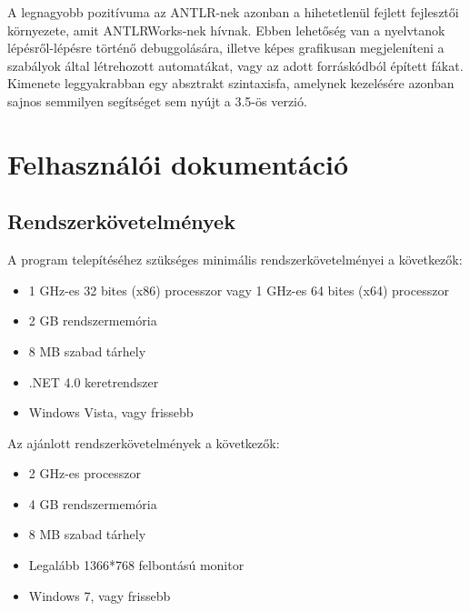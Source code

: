 \documentclass[a4paper,12pt]{report}
\begin{document}
A legnagyobb pozitívuma az ANTLR-nek azonban a hihetetlenül fejlett fejlesztői környezete, amit ANTLRWorks-nek hívnak. Ebben lehetőség van a nyelvtanok lépésről-lépésre történő debuggolására, illetve képes grafikusan megjeleníteni a szabályok által létrehozott automatákat, vagy az adott forráskódból épített fákat. \\

Kimenete leggyakrabban egy absztrakt szintaxisfa, amelynek kezelésére azonban sajnos semmilyen segítséget sem nyújt a 3.5-ös verzió.








\chapter{Felhasználói dokumentáció}

\section{Rendszerkövetelmények}
A program telepítéséhez szükséges minimális rendszerkövetelményei a következők:
\begin{itemize}
    \item 1 GHz-es 32 bites (x86) processzor vagy 1 GHz-es 64 bites (x64) processzor
    \item 2 GB rendszermemória
    \item 8 MB szabad tárhely
    \item .NET 4.0 keretrendszer
    \item Windows Vista, vagy frissebb
\end{itemize}

Az ajánlott rendszerkövetelmények a következők:
\begin{itemize}
    \item 2 GHz-es processzor
    \item 4 GB rendszermemória
    \item 8 MB szabad tárhely
    \item Legalább 1366*768 felbontású monitor
    \item Windows 7, vagy frissebb
\end{itemize}
\end{document}
